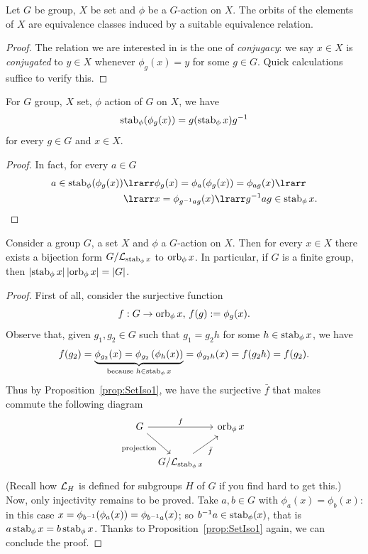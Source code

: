 \begin{proposition}
Let \(G\) be group, \(X\) be set and \(\phi\) be a \(G\)-action on \(X\). The orbits of the elements of \(X\) are equivalence classes induced by a suitable equivalence relation.
\end{proposition}

\begin{proof}
The relation we are interested in is the one of {\em conjugacy}: we say \(x \in X\) is {\em conjugated} to \(y \in X\) whenever \(\phi_g (x) = y\) for some \(g \in G\). Quick calculations suffice to verify this.
\end{proof}

\begin{proposition}
For \(G\) group, \(X\) set, \(\phi\) action of \(G\) on \(X\), we have
\[\operatorname{stab}_\phi(\phi_g (x)) = g (\operatorname{stab}_\phi x) g^{-1}\]
for every \(g \in G\) and \(x \in X\). 
\end{proposition}

\begin{proof}
In fact, for every \(a \in G\)
\begin{align*}
a \in \stab_\phi (\phi_g (x)) & \lrarr \phi_g (x) = \phi_a (\phi_g (x)) = \phi_{ag} (x) \lrarr \\
& \lrarr x = \phi_{\inv g a g} (x) \lrarr \inv g a g \in \stab_\phi x . \qedhere
\end{align*}
\end{proof}

\begin{proposition}\label{prop:OrbsStabsCosets}
Consider a group \(G\), a set \(X\) and \(\phi\) a \(G\)-action on \(X\). Then for every \(x \in X\) there exists a bijection form \(G/\mathcal L_{\operatorname{stab}_\phi x}\) to \(\operatorname{orb}_\phi x\). In particular, if \(G\) is a finite group, then \(\left\lvert\operatorname{stab}_\phi x\right\rvert \left\lvert\operatorname{orb}_\phi x\right\rvert = \left\lvert G\right\rvert\).
\end{proposition}

\begin{proof}
First of all, consider the surjective function
\[f : G 	\to \operatorname{orb}_\phi x,\, f(g) := \phi_g(x) .\]
Observe that, given \(g_1, g_2 \in G\) such that \(g_1 = g_2 h\) for some \(h \in \operatorname{stab}_\phi x\), we have
\[f(g_2) = \underbrace{\phi_{g_2} (x) = \phi_{g_2} \left(\phi_h (x)\right)}_{\text{because } h \in \operatorname{stab}_\phi x} = \phi_{g_2h} (x) = f(g_2 h) = f(g_2) .\]
Thus by Proposition~\ref{prop:SetIso1}, we have the surjective \(\bar f\) that makes commute the following diagram
\[\begin{tikzcd}[column sep=tiny]
G \ar["{\text{projection}}", dr, swap] \ar["f", rr] & & \orb_\phi x \\
 & G{/}{\call_{\stab_\phi x}} \ar["{\bar f}", ur, swap]
\end{tikzcd}\]
(Recall how \(\mathcal L_H\) is defined for subgroups \(H\) of \(G\) if you find hard to get this.) Now, only injectivity remains to be proved. Take \(a, b \in G\) with \(\phi_a (x) = \phi_b (x)\): in this case \(x = \phi_{b^{-1}} (\phi_a (x)) = \phi_{b^{-1} a} (x)\); so \(b^{-1} a \in \operatorname{stab}_\phi (x)\), that is \(a \operatorname{stab}_\phi x = b \operatorname{stab}_\phi x\). Thanks to Proposition~\ref{prop:SetIso1} again, we can conclude the proof.
\end{proof}

